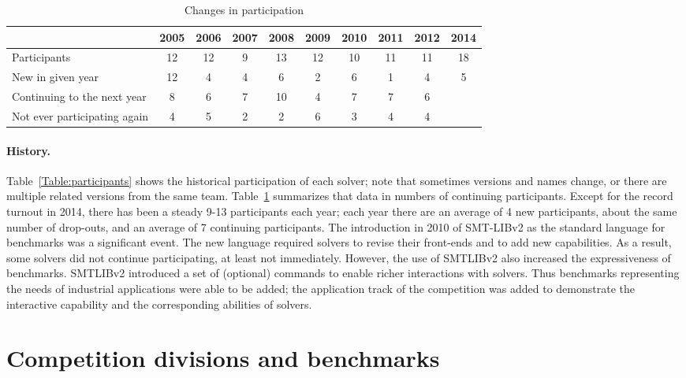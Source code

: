 \documentclass[twosize,11pt]{article}
\begin{document}
\begin{table}
\centering
\begin{tabular}{|l|c|c|c|c|c|c|c|c|c|}
\hline
 & 2005 & 2006 & 2007 & 2008 & 2009 & 2010 & 2011 & 2012 & 2014\\
\hline
Participants                 & 12 & 12 & 9 & 13 & 12 & 10 & 11 & 11 & 18 \\
New in given year            & 12 &  4 & 4 &  6 &  2 &  6 &  1 &  4 & 5 \\
Continuing to the next year  &  8 &  6 & 7 & 10 &  4 &  7 &  7 &  6 &  \\
Not ever participating again &  4 &  5 & 2 &  2 &  6 &  3 &  4 &  4 &  \\ 
\hline
\end{tabular}
\vspace{.2in}
\caption{Changes in participation}
\label{Table:changes}
\end{table}

\paragraph{History.} Table~\ref{Table:participants} shows the
 historical participation of each solver; note that sometimes versions and names change, or there are multiple related versions from the same team. 
Table~\ref{Table:changes} summarizes that data in numbers of continuing participants. Except for the record turnout in
 2014, there has been a steady 9-13 participants each year; each year there are an average of 4 new
 participants, about the same number of drop-outs, and an average of 7 continuing participants. 
The introduction in 2010 of SMT-LIBv2 as the standard language for benchmarks was a significant event. The new language required solvers to revise their front-ends and to add new capabilities.
As a result, some solvers did not continue participating, at least not immediately. However, the use of SMTLIBv2 also increased the expressiveness of benchmarks. SMTLIBv2 introduced a set of (optional) commands to enable richer interactions with solvers. Thus benchmarks representing the needs of industrial applications were able to be added; 
the application track of the competition was added to demonstrate the interactive capability and the corresponding abilities of solvers.

\section{Competition divisions and benchmarks}
\label{sec:benchmarks}
\end{document}
